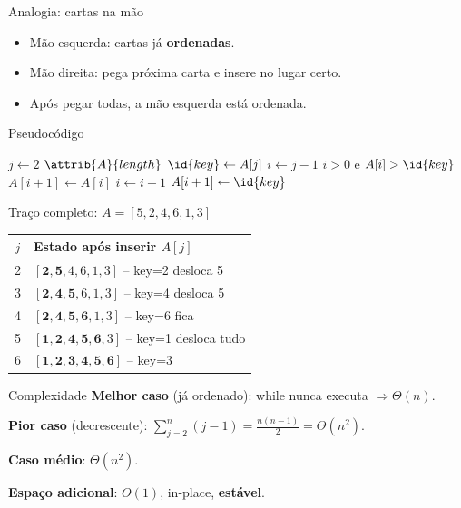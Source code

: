 \documentclass[aspectratio=169]{beamer}
\begin{document}
\begin{frame}{Analogia: cartas na mão}
\begin{itemize}
\item Mão esquerda: cartas já \textbf{ordenadas}.
\item Mão direita: pega próxima carta e insere no lugar certo.
\item Após pegar todas, a mão esquerda está ordenada.
\end{itemize}
\end{frame}

\begin{frame}[fragile]{Pseudocódigo}
\begin{codebox}
\li \For $j \gets 2$ \To $\attrib{A}{length}$
\li \Do $\id{key} \gets A[j]$
\li     $i \gets j-1$
\li     \While $i>0$ e $A[i]>\id{key}$
\li     \Do $A[i+1] \gets A[i]$
\li         $i \gets i-1$
        \End
\li     $A[i+1] \gets \id{key}$
    \End
\end{codebox}
\end{frame}

\begin{frame}{Traço completo: $A=[5,2,4,6,1,3]$}
\small
\begin{tabular}{cl}
\toprule
$j$ & Estado após inserir $A[j]$ \\
\midrule
2 & $[\mathbf{2,5},4,6,1,3]$ -- key=2 desloca 5 \\
3 & $[\mathbf{2,4,5},6,1,3]$ -- key=4 desloca 5 \\
4 & $[\mathbf{2,4,5,6},1,3]$ -- key=6 fica \\
5 & $[\mathbf{1,2,4,5,6},3]$ -- key=1 desloca tudo \\
6 & $[\mathbf{1,2,3,4,5,6}]$ -- key=3 \\
\bottomrule
\end{tabular}
\end{frame}

\begin{frame}{Complexidade}
\textbf{Melhor caso} (já ordenado): while nunca executa $\Rightarrow \Theta(n)$.

\textbf{Pior caso} (decrescente): $\sum_{j=2}^n (j-1) = \frac{n(n-1)}{2} = \Theta(n^2)$.

\textbf{Caso médio}: $\Theta(n^2)$.

\textbf{Espaço adicional}: $O(1)$, in-place, \textbf{estável}.
\end{frame}
\end{document}
